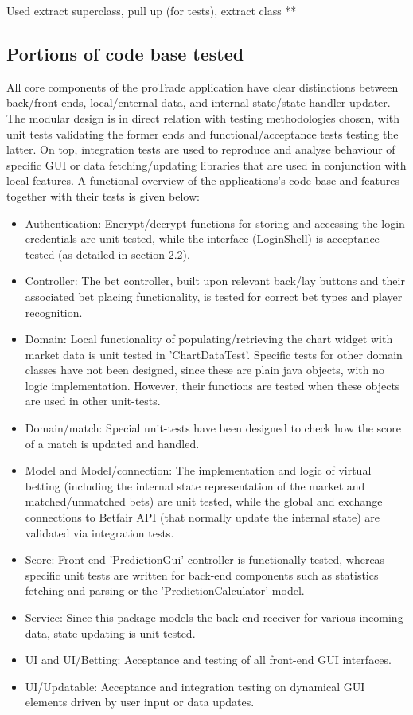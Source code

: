 \documentclass[10pt]{article}
\begin{document}
Used extract superclass, pull up (for tests), extract class
**
\subsection{Portions of code base tested}

All core components of the proTrade application have clear distinctions between back/front ends, local/enternal data, and internal state/state handler-updater. The modular design is in direct relation with testing methodologies chosen, with unit tests validating the former ends and functional/acceptance tests testing the latter. On top, integration tests are used to reproduce and analyse behaviour of specific GUI or data fetching/updating libraries that are used in conjunction with local features. A functional overview of the applications's code base and features together with their tests is given below:

\begin{itemize}
\renewcommand{\labelitemi}{$\bullet$}
\item Authentication: Encrypt/decrypt functions for storing and accessing the login credentials are unit tested, while the interface (LoginShell) is acceptance tested (as detailed in section 2.2).
\item Controller: The bet controller, built upon relevant back/lay buttons and their associated bet placing functionality, is tested for correct bet types and player recognition.
\item Domain: Local functionality of populating/retrieving the chart widget with market data is unit tested in 'ChartDataTest'. Specific tests for other domain classes have not been designed, since these are plain java objects, with no logic implementation. However, their functions are tested when these objects are used in other unit-tests.
\item Domain/match: Special unit-tests have been designed to check how the score of a match is updated and handled.
\item Model and Model/connection: The implementation and logic of virtual betting (including the internal state representation of the market and matched/unmatched bets) are unit tested, while the global and exchange connections to Betfair API (that normally update the internal state) are validated via integration tests.     
\item Score: Front end 'PredictionGui' controller is functionally tested, whereas specific unit tests are written for back-end components such as statistics fetching and parsing or the 'PredictionCalculator' model. 
\item Service: Since this package models the back end receiver for various incoming data, state updating is unit tested.
\item UI and UI/Betting: Acceptance and testing of all front-end GUI interfaces.
\item UI/Updatable: Acceptance and integration testing on dynamical GUI elements driven by user input or data updates.
\end{itemize}
\end{document}
